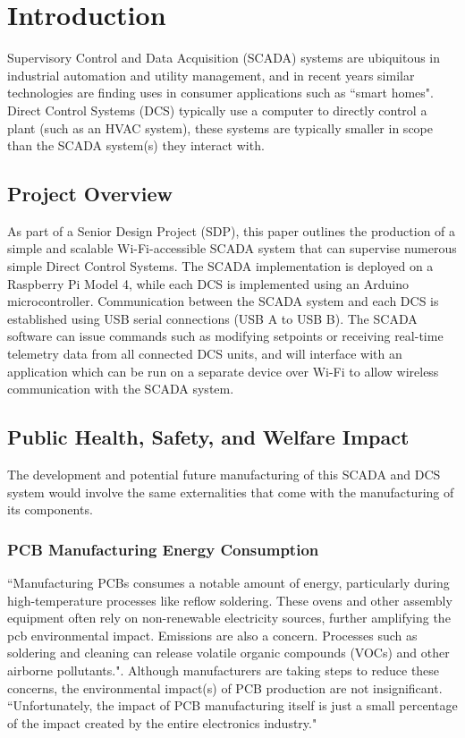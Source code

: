 \documentclass[../main.tex]{subfiles}
\begin{document}
\section{Introduction}
\label{sec:intro}

\par Supervisory Control and Data Acquisition (SCADA) systems are ubiquitous in industrial automation and utility management, and in recent years similar technologies are finding uses in consumer applications such as ``smart homes". Direct Control Systems (DCS) typically use a computer to directly control a plant (such as an HVAC system), these systems are typically smaller in scope than the SCADA system(s) they interact with.

\subsection{Project Overview}
\par As part of a Senior Design Project (SDP), this paper outlines the production of a simple and scalable Wi-Fi-accessible SCADA system that can supervise numerous simple Direct Control Systems. The SCADA implementation is deployed on a Raspberry Pi Model 4, while each DCS is implemented using an Arduino microcontroller. Communication between the SCADA system and each DCS is established using USB serial connections (USB A to USB B). The SCADA software can issue commands such as modifying setpoints or receiving real-time telemetry data from all connected DCS units, and will interface with an application which can be run on a separate device over Wi-Fi to allow wireless communication with the SCADA system.

\subsection{Public Health, Safety, and Welfare Impact}\label{sec_health_safety-4810FP}
\par The development and potential future manufacturing of this SCADA and DCS system would involve the same externalities that come with the manufacturing of its components. 

\subsubsection{PCB Manufacturing Energy Consumption}
``Manufacturing PCBs consumes a notable amount of energy, particularly during high-temperature processes like reflow soldering. These ovens and other assembly equipment often rely on non-renewable electricity sources, further amplifying the pcb environmental impact. Emissions are also a concern. Processes such as soldering and cleaning can release volatile organic compounds (VOCs) and other airborne pollutants."\cite{b1}. Although manufacturers are taking steps to reduce these concerns\cite{b1}, the environmental impact(s) of PCB production are not insignificant. ``Unfortunately, the impact of PCB manufacturing itself is just a small percentage of the impact created by the entire electronics industry."\cite{b2}
\end{document}
